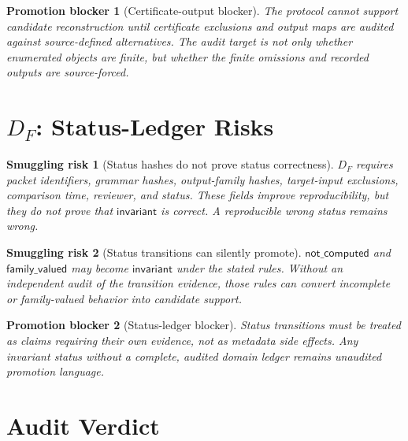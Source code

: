 \documentclass[11pt]{article}
\newtheorem{smugglingrisk}{Smuggling risk}
\newtheorem{promotionblocker}{Promotion blocker}
\begin{document}
\begin{promotionblocker}[Certificate-output blocker]
The protocol cannot support candidate reconstruction until certificate
exclusions and output maps are audited against source-defined alternatives.
The audit target is not only whether enumerated objects are finite, but
whether the finite omissions and recorded outputs are source-forced.
\end{promotionblocker}

\section{\texorpdfstring{\(D_F\)}{DF}: Status-Ledger Risks}

\begin{smugglingrisk}[Status hashes do not prove status correctness]
\(D_F\) requires packet identifiers, grammar hashes, output-family hashes,
target-input exclusions, comparison time, reviewer, and status. These fields
improve reproducibility, but they do not prove that
\(\mathsf{invariant}\) is correct. A reproducible wrong status remains wrong.
\end{smugglingrisk}

\begin{smugglingrisk}[Status transitions can silently promote]
\(\mathsf{not\_computed}\) and \(\mathsf{family\_valued}\) may become
\(\mathsf{invariant}\) under the stated rules. Without an independent audit
of the transition evidence, those rules can convert incomplete or
family-valued behavior into candidate support.
\end{smugglingrisk}

\begin{promotionblocker}[Status-ledger blocker]
Status transitions must be treated as claims requiring their own evidence,
not as metadata side effects. Any invariant status without a complete,
audited domain ledger remains unaudited promotion language.
\end{promotionblocker}

\section{Audit Verdict}
\end{document}
